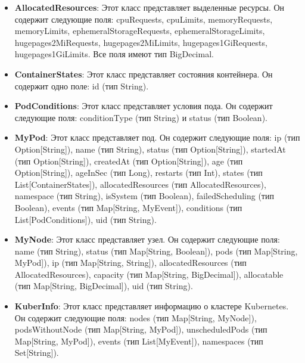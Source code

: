 \begin{itemize}
\item \textbf{AllocatedResources}: Этот класс представляет выделенные ресурсы.
Он содержит следующие поля: cpuRequests, cpuLimits, memoryRequests,
memoryLimits, ephemeralStorageRequests, ephemeralStorageLimits,
hugepages2MiRequests, hugepages2MiLimits, hugepages1GiRequests,
hugepages1GiLimits. Все поля имеют тип BigDecimal.

\item \textbf{ContainerStates}: Этот класс представляет состояния контейнера. Он
содержит одно поле: id (тип String).

\item \textbf{PodConditions}: Этот класс представляет условия пода. Он содержит
следующие поля: conditionType (тип String) и status (тип Boolean).

\item \textbf{MyPod}: Этот класс представляет под. Он содержит следующие поля:
ip (тип Option[String]), name (тип String), status (тип Option[String]),
startedAt (тип Option[String]), createdAt (тип Option[String]), age (тип
Option[String]), ageInSec (тип Long), restarts (тип Int), states (тип
List[ContainerStates]), allocatedResources (тип AllocatedResources), namespace
(тип String), isSystem (тип Boolean), failedScheduling (тип Boolean), events
(тип Map[String, MyEvent]), conditions (тип List[PodConditions]), uid (тип
String).

\item \textbf{MyNode}: Этот класс представляет узел. Он содержит следующие поля:
name (тип String), status (тип Map[String, Boolean]), pods (тип Map[String,
MyPod]), ip (тип Map[String, String]), allocatedResources (тип
AllocatedResources), capacity (тип Map[String, BigDecimal]), allocatable (тип
Map[String, BigDecimal]), uid (тип String).

\item \textbf{KuberInfo}: Этот класс представляет информацию о кластере
Kubernetes. Он содержит следующие поля: nodes (тип Map[String, MyNode]),
podsWithoutNode (тип Map[String, MyPod]), unscheduledPods (тип Map[String,
MyPod]), events (тип List[MyEvent]), namespaces (тип Set[String]).
\end{itemize}



